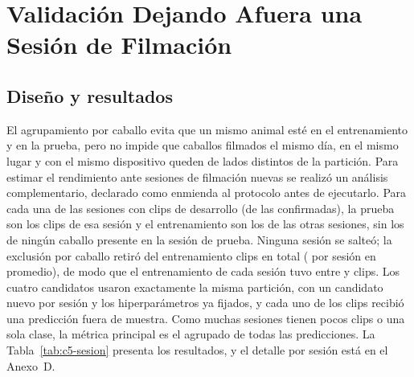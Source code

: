 \section{Validación Dejando Afuera una Sesión de Filmación}
\subsection{Diseño y resultados}
El agrupamiento por caballo evita que un mismo animal esté en el entrenamiento y en la prueba, pero no impide que caballos filmados el mismo día, en el mismo lugar y con el mismo dispositivo queden de lados distintos de la partición. Para estimar el rendimiento ante sesiones de filmación nuevas se realizó un análisis complementario, declarado como enmienda al protocolo antes de ejecutarlo. Para cada una de las \SesionesEvaluadas{} sesiones con clips de desarrollo (de las \SesionesTotal{} confirmadas), la prueba son los clips de esa sesión y el entrenamiento son los de las otras sesiones, sin los de ningún caballo presente en la sesión de prueba. Ninguna sesión se salteó; la exclusión por caballo retiró del entrenamiento \ClipsTrainPerdidos{} clips en total (\ClipsTrainPerdidosMedia{} por sesión en promedio), de modo que el entrenamiento de cada sesión tuvo entre \ClipsTrainSesionMin{} y \ClipsTrainSesionMax{} clips. Los cuatro candidatos usaron exactamente la misma partición, con un candidato nuevo por sesión y los hiperparámetros ya fijados, y cada uno de los \ClipsDesarrollo{} clips recibió una predicción fuera de muestra. Como muchas sesiones tienen pocos clips o una sola clase, la métrica principal es el \fmacro{} agrupado de todas las predicciones. La Tabla~\ref{tab:c5-sesion} presenta los resultados, y el detalle por sesión está en el Anexo~D.

